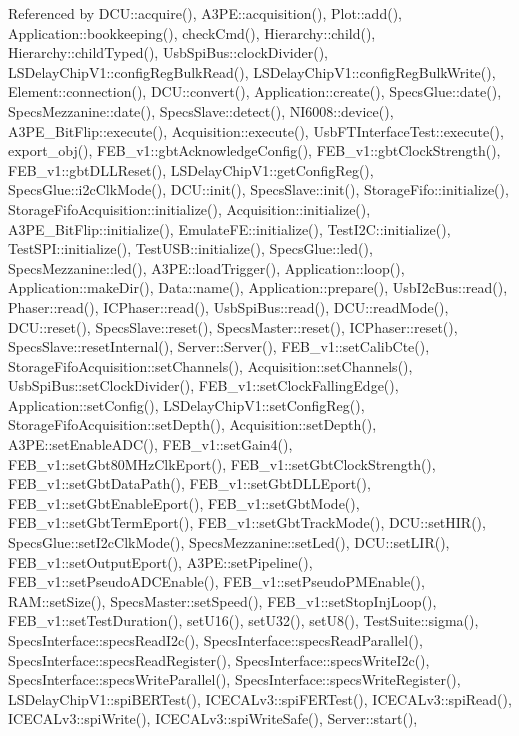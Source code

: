 Referenced by D\+C\+U\+::acquire(), A3\+P\+E\+::acquisition(), Plot\+::add(), Application\+::bookkeeping(), check\+Cmd(), Hierarchy\+::child(), Hierarchy\+::child\+Typed(), Usb\+Spi\+Bus\+::clock\+Divider(), L\+S\+Delay\+Chip\+V1\+::config\+Reg\+Bulk\+Read(), L\+S\+Delay\+Chip\+V1\+::config\+Reg\+Bulk\+Write(), Element\+::connection(), D\+C\+U\+::convert(), Application\+::create(), Specs\+Glue\+::date(), Specs\+Mezzanine\+::date(), Specs\+Slave\+::detect(), N\+I6008\+::device(), A3\+P\+E\+\_\+\+Bit\+Flip\+::execute(), Acquisition\+::execute(), Usb\+F\+T\+Interface\+Test\+::execute(), export\+\_\+obj(), F\+E\+B\+\_\+v1\+::gbt\+Acknowledge\+Config(), F\+E\+B\+\_\+v1\+::gbt\+Clock\+Strength(), F\+E\+B\+\_\+v1\+::gbt\+D\+L\+L\+Reset(), L\+S\+Delay\+Chip\+V1\+::get\+Config\+Reg(), Specs\+Glue\+::i2c\+Clk\+Mode(), D\+C\+U\+::init(), Specs\+Slave\+::init(), Storage\+Fifo\+::initialize(), Storage\+Fifo\+Acquisition\+::initialize(), Acquisition\+::initialize(), A3\+P\+E\+\_\+\+Bit\+Flip\+::initialize(), Emulate\+F\+E\+::initialize(), Test\+I2\+C\+::initialize(), Test\+S\+P\+I\+::initialize(), Test\+U\+S\+B\+::initialize(), Specs\+Glue\+::led(), Specs\+Mezzanine\+::led(), A3\+P\+E\+::load\+Trigger(), Application\+::loop(), Application\+::make\+Dir(), Data\+::name(), Application\+::prepare(), Usb\+I2c\+Bus\+::read(), Phaser\+::read(), I\+C\+Phaser\+::read(), Usb\+Spi\+Bus\+::read(), D\+C\+U\+::read\+Mode(), D\+C\+U\+::reset(), Specs\+Slave\+::reset(), Specs\+Master\+::reset(), I\+C\+Phaser\+::reset(), Specs\+Slave\+::reset\+Internal(), Server\+::\+Server(), F\+E\+B\+\_\+v1\+::set\+Calib\+Cte(), Storage\+Fifo\+Acquisition\+::set\+Channels(), Acquisition\+::set\+Channels(), Usb\+Spi\+Bus\+::set\+Clock\+Divider(), F\+E\+B\+\_\+v1\+::set\+Clock\+Falling\+Edge(), Application\+::set\+Config(), L\+S\+Delay\+Chip\+V1\+::set\+Config\+Reg(), Storage\+Fifo\+Acquisition\+::set\+Depth(), Acquisition\+::set\+Depth(), A3\+P\+E\+::set\+Enable\+A\+D\+C(), F\+E\+B\+\_\+v1\+::set\+Gain4(), F\+E\+B\+\_\+v1\+::set\+Gbt80\+M\+Hz\+Clk\+Eport(), F\+E\+B\+\_\+v1\+::set\+Gbt\+Clock\+Strength(), F\+E\+B\+\_\+v1\+::set\+Gbt\+Data\+Path(), F\+E\+B\+\_\+v1\+::set\+Gbt\+D\+L\+L\+Eport(), F\+E\+B\+\_\+v1\+::set\+Gbt\+Enable\+Eport(), F\+E\+B\+\_\+v1\+::set\+Gbt\+Mode(), F\+E\+B\+\_\+v1\+::set\+Gbt\+Term\+Eport(), F\+E\+B\+\_\+v1\+::set\+Gbt\+Track\+Mode(), D\+C\+U\+::set\+H\+I\+R(), Specs\+Glue\+::set\+I2c\+Clk\+Mode(), Specs\+Mezzanine\+::set\+Led(), D\+C\+U\+::set\+L\+I\+R(), F\+E\+B\+\_\+v1\+::set\+Output\+Eport(), A3\+P\+E\+::set\+Pipeline(), F\+E\+B\+\_\+v1\+::set\+Pseudo\+A\+D\+C\+Enable(), F\+E\+B\+\_\+v1\+::set\+Pseudo\+P\+M\+Enable(), R\+A\+M\+::set\+Size(), Specs\+Master\+::set\+Speed(), F\+E\+B\+\_\+v1\+::set\+Stop\+Inj\+Loop(), F\+E\+B\+\_\+v1\+::set\+Test\+Duration(), set\+U16(), set\+U32(), set\+U8(), Test\+Suite\+::sigma(), Specs\+Interface\+::specs\+Read\+I2c(), Specs\+Interface\+::specs\+Read\+Parallel(), Specs\+Interface\+::specs\+Read\+Register(), Specs\+Interface\+::specs\+Write\+I2c(), Specs\+Interface\+::specs\+Write\+Parallel(), Specs\+Interface\+::specs\+Write\+Register(), L\+S\+Delay\+Chip\+V1\+::spi\+B\+E\+R\+Test(), I\+C\+E\+C\+A\+Lv3\+::spi\+F\+E\+R\+Test(), I\+C\+E\+C\+A\+Lv3\+::spi\+Read(), I\+C\+E\+C\+A\+Lv3\+::spi\+Write(), I\+C\+E\+C\+A\+Lv3\+::spi\+Write\+Safe(), Server\+::start(), 